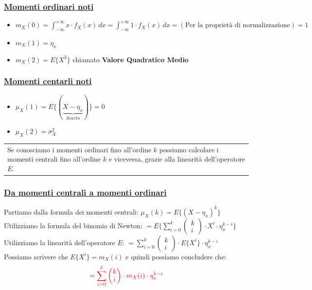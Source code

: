\documentclass{article}
\begin{document}
\subsubsection{\underline{Momenti ordinari noti}}
\begin{itemize}
    \item $m_X(0) = \int_{-\infty}^{+\infty}x \cdot f_X(x) \,dx = \int_{-\infty}^{+\infty}1 \cdot f_X(x) \,dx = \left( \text{Per la proprietà di normalizzazione} \right) = 1$
    \item $m_X(1) = \eta_x$
    \item $m_X(2) = E\big\{ X^2\big\}$ chiamato \textbf{Valore Quadratico Medio}
\end{itemize}
\subsubsection{\underline{Momenti centarli noti}}
\begin{itemize}
    \item $\mu_X(1) = E \big\{ ( \underset{Scarto}{\underbrace{X-\eta_x}} )\big\} = 0$
    \item $\mu_X(2) = \sigma_X^2$
\end{itemize}
\begin{tabular}{|p{13cm}}
Se conosciamo i momenti ordinari fino all’ordine $k$ possiamo calcolare i momenti centrali fino all’ordine $k$ e viceversa, grazie alla linearità dell’operatore $E$.
\end{tabular}
\subsubsection{\underline{Da momenti centrali a momenti ordinari}}
Partiamo dalla formula dei momenti centrali: $\mu_X(k) = E\Big\{ \left(X-\eta_x\right)^k\Big\}$ \\
Utilizziamo la formula del binomio di Newton: $= E\Bigg\{ \sum_{i=0}^{k} \left( \begin{matrix} k \\ i\end{matrix} \right) \cdot X^i \cdot \eta_x^{k-i}\Bigg\}$ \\
Utilizziamo la linearità dell’operatore $E$: $= \sum_{i=0}^{k} \left( \begin{matrix} k \\ i\end{matrix} \right) \cdot E\Big\{  X^i \Big\} \cdot \eta_x^{k-i}$ \\
Possiamo scrivere che $E\Big\{  X^i \Big \} = m_X(i)$ e quindi possiamo concludere che:
\[= \color{red} \sum_{i=0}^{k} \left( \begin{matrix} k \\ i\end{matrix} \right) \cdot m_X(i) \cdot \eta_x^{k-i}\]
\end{document}

